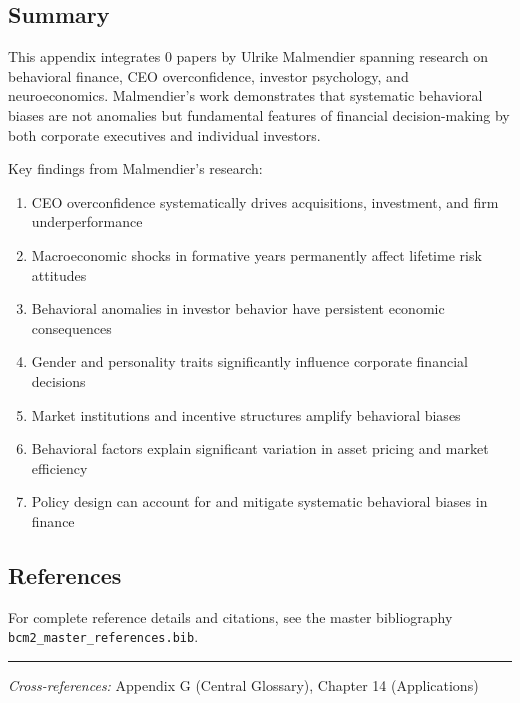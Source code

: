 \subsection{Summary}

This appendix integrates 0 papers by Ulrike Malmendier spanning research on behavioral finance, CEO overconfidence, investor psychology, and neuroeconomics. Malmendier's work demonstrates that systematic behavioral biases are not anomalies but fundamental features of financial decision-making by both corporate executives and individual investors.

Key findings from Malmendier's research:

\begin{enumerate}
  \item CEO overconfidence systematically drives acquisitions, investment, and firm underperformance
  \item Macroeconomic shocks in formative years permanently affect lifetime risk attitudes
  \item Behavioral anomalies in investor behavior have persistent economic consequences
  \item Gender and personality traits significantly influence corporate financial decisions
  \item Market institutions and incentive structures amplify behavioral biases
  \item Behavioral factors explain significant variation in asset pricing and market efficiency
  \item Policy design can account for and mitigate systematic behavioral biases in finance
\end{enumerate}

\subsection{References}

For complete reference details and citations, see the master bibliography
\texttt{bcm2\_master\_references.bib}.

\vspace{1em}
\hrule
\vspace{0.5em}

\noindent\textit{Cross-references:}
Appendix G (Central Glossary), Chapter 14 (Applications)
